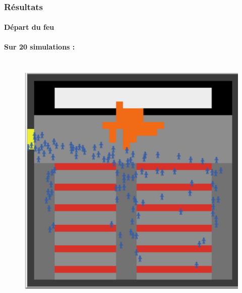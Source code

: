 \documentclass[10pt]{beamer}
\begin{document}
\begin{frame}
	\frametitle{\textbf {\Large Résultats}}
	\framesubtitle{\normalsize Départ du feu}
	
	\begin{center}
	\textbf{\normalsize Sur 20 simulations : }
	\end{center}
	
	\begin{columns}

			\begin{figure}
				\includegraphics[width=\linewidth]{capture_feu.PNG}
 				\label{pic: feu}
 			\end{figure}
 

\end{columns}
\end{frame}
\end{document}

